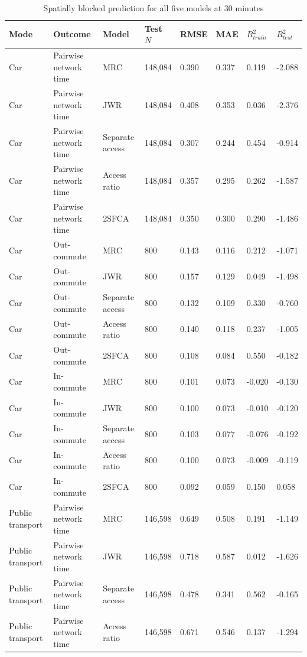 \begin{landscape}
\begin{table}[htbp]
\centering
\scriptsize
\caption{Spatially blocked prediction for all five models at 30 minutes}
\label{tab:cvall30}
\begin{tabular}{llllllll}
\toprule
Mode & Outcome & Model & Test $N$ & RMSE & MAE & $R^2_{train}$ & $R^2_{test}$ \\
\midrule
Car & Pairwise network time & MRC & 148,084 & 0.390 & 0.337 & 0.119 & -2.088 \\
Car & Pairwise network time & JWR & 148,084 & 0.408 & 0.353 & 0.036 & -2.376 \\
Car & Pairwise network time & Separate access & 148,084 & 0.307 & 0.244 & 0.454 & -0.914 \\
Car & Pairwise network time & Access ratio & 148,084 & 0.357 & 0.295 & 0.262 & -1.587 \\
Car & Pairwise network time & 2SFCA & 148,084 & 0.350 & 0.300 & 0.290 & -1.486 \\
Car & Out-commute & MRC & 800 & 0.143 & 0.116 & 0.212 & -1.071 \\
Car & Out-commute & JWR & 800 & 0.157 & 0.129 & 0.049 & -1.498 \\
Car & Out-commute & Separate access & 800 & 0.132 & 0.109 & 0.330 & -0.760 \\
Car & Out-commute & Access ratio & 800 & 0.140 & 0.118 & 0.237 & -1.005 \\
Car & Out-commute & 2SFCA & 800 & 0.108 & 0.084 & 0.550 & -0.182 \\
Car & In-commute & MRC & 800 & 0.101 & 0.073 & -0.020 & -0.130 \\
Car & In-commute & JWR & 800 & 0.100 & 0.073 & -0.010 & -0.120 \\
Car & In-commute & Separate access & 800 & 0.103 & 0.077 & -0.076 & -0.192 \\
Car & In-commute & Access ratio & 800 & 0.100 & 0.073 & -0.009 & -0.119 \\
Car & In-commute & 2SFCA & 800 & 0.092 & 0.059 & 0.150 & 0.058 \\
Public transport & Pairwise network time & MRC & 146,598 & 0.649 & 0.508 & 0.191 & -1.149 \\
Public transport & Pairwise network time & JWR & 146,598 & 0.718 & 0.587 & 0.012 & -1.626 \\
Public transport & Pairwise network time & Separate access & 146,598 & 0.478 & 0.341 & 0.562 & -0.165 \\
Public transport & Pairwise network time & Access ratio & 146,598 & 0.671 & 0.546 & 0.137 & -1.294 \\

\end{tabular}
\end{table}
\end{landscape}
